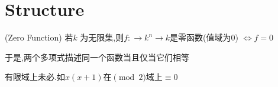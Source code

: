 \section{Structure}
(Zero Function) 若$ k$ 为无限集,则$ f:\rightarrow k^n\rightarrow k$是零函数(值域为0)
$ \Leftrightarrow f=0$

于是,两个多项式描述同一个函数当且仅当它们相等

有限域上未必.如$ x(x+1)$在$ \pmod 2$域上$ \equiv 0$
